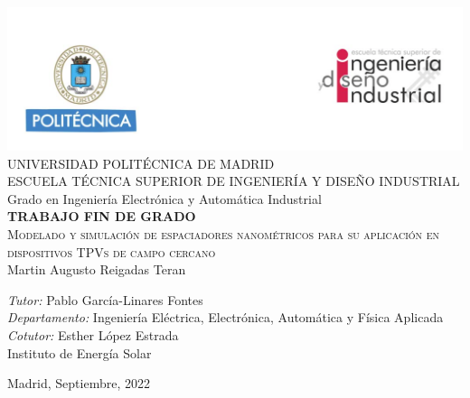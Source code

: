 \begin{titlepage}
\begin{center}
\includegraphics[width=1\textwidth]{figuras/cabecera.png}  \\[0.5 cm]

\LARGE UNIVERSIDAD POLITÉCNICA DE MADRID \\ [1 cm]

\LARGE ESCUELA TÉCNICA SUPERIOR DE INGENIERÍA Y DISEÑO INDUSTRIAL \\ [1 cm]

\LARGE Grado en Ingeniería Electrónica y Automática Industrial\\ [1 cm]

\LARGE \textbf{TRABAJO FIN DE GRADO}\\[0.75 cm]

\Huge \textsc{Modelado y simulación de espaciadores nanométricos para su aplicación en dispositivos TPVs de campo cercano}\\[1 cm]

\LARGE Martin Augusto Reigadas Teran \\[0.5 cm]
\begin{flushleft}
\Large
\emph{Tutor:} {Pablo García-Linares Fontes}\\
\emph{Departamento:} Ingeniería Eléctrica, Electrónica, Automática y Física Aplicada\\
\emph{Cotutor:} Esther López Estrada\\
Instituto de Energía Solar\\
\end{flushleft}

\vfill

{\large Madrid, Septiembre, 2022}
\cleardoublepage 
\end{center}
\end{titlepage}
